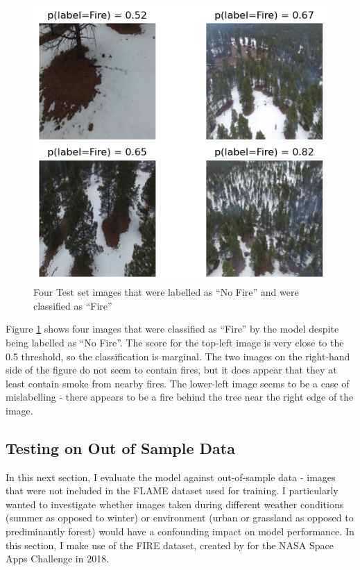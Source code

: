 \documentclass[a4paper,11pt]{article} %
\begin{document}
\begin{figure}[h]
    \centering
    \includegraphics{../figures/false_positive_examples.png}
    \caption{Four Test set images that were labelled as ``No Fire'' and were classified as ``Fire''}
    \label{fig:false_positives}
\end{figure}

\medskip

Figure \ref{fig:false_positives} shows four images that were classified as ``Fire'' by the model despite being labelled as ``No Fire''.
The score for the top-left image is very close to the 0.5 threshold, so the classification is marginal. The two images on the right-hand side
of the figure do not seem to contain fires, but it does appear that they at least contain smoke from nearby fires. The lower-left image seems to
be a case of mislabelling - there appears to be a fire behind the tree near the right edge of the image.

\subsection{Testing on Out of Sample Data}
In this next section, I evaluate the model against out-of-sample data - images that were not included in the FLAME dataset used for training. I particularly
wanted to investigate whether images taken during different weather conditions (summer as opposed to winter) or environment (urban or grassland as opposed to prediminantly forest)
would have a confounding impact on model performance. In this section, I make use of the FIRE dataset, created by  for the NASA
Space Apps Challenge in 2018.
\end{document}
